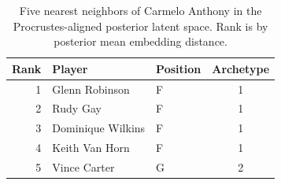 \begin{table}[htbp]
  \centering\small
  \begin{tabular}{rllc}
    \toprule
    Rank & Player & Position & Archetype \\
    \midrule
    1 & Glenn Robinson & F & 1 \\
    2 & Rudy Gay & F & 1 \\
    3 & Dominique Wilkins & F & 1 \\
    4 & Keith Van Horn & F & 1 \\
    5 & Vince Carter & G & 2 \\
    \bottomrule
  \end{tabular}
  \caption{Five nearest neighbors of Carmelo Anthony in the Procrustes-aligned posterior latent space. Rank is by posterior mean embedding distance.}
  \label{tab:Carmelo_Anthony_neighbors}
\end{table}


